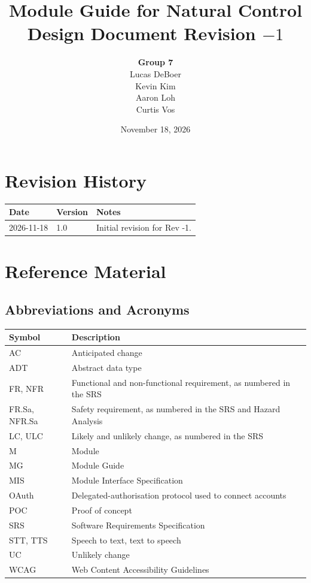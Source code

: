 \documentclass[12pt, titlepage]{article}
\newcommand{\progname}{Natural Control}
\begin{document}
\title{Module Guide for \progname{}\\[4pt]\large Design Document Revision $-1$}
\author{\textbf{Group 7}\\Lucas DeBoer\\Kevin Kim\\Aaron Loh\\Curtis Vos}
\date{November 18, 2026}
\maketitle


\section{Revision History}

\begin{tabularx}{\textwidth}{p{3cm}p{2cm}X}
\toprule
\textbf{Date} & \textbf{Version} & \textbf{Notes}\\
\midrule
2026-11-18 & 1.0 & Initial revision for Rev -1.\\
\bottomrule
\end{tabularx}

\section{Reference Material}

\subsection{Abbreviations and Acronyms}

\begin{tabularx}{\textwidth}{lX}
\toprule
\textbf{Symbol} & \textbf{Description}\\
\midrule
AC & Anticipated change\\
ADT & Abstract data type\\
FR, NFR & Functional and non-functional requirement, as numbered in the SRS\\
FR.Sa, NFR.Sa & Safety requirement, as numbered in the SRS and Hazard Analysis\\
LC, ULC & Likely and unlikely change, as numbered in the SRS\\
M & Module\\
MG & Module Guide\\
MIS & Module Interface Specification\\
OAuth & Delegated-authorisation protocol used to connect accounts\\
POC & Proof of concept\\
SRS & Software Requirements Specification\\
STT, TTS & Speech to text, text to speech\\
UC & Unlikely change\\
WCAG & Web Content Accessibility Guidelines\\
\bottomrule
\end{tabularx}
\end{document}
